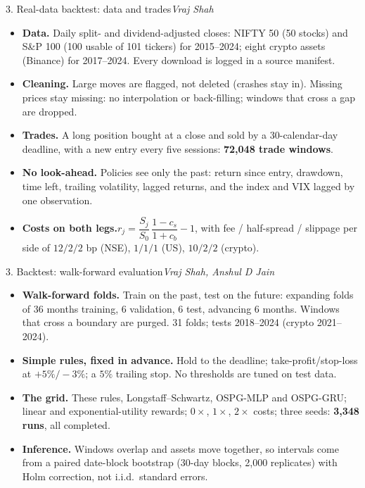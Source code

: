 \documentclass[aspectratio=169,11pt]{beamer}
\newcommand{\by}[1]{\hfill{\normalfont\small\itshape #1}}
\begin{document}
\begin{frame}{3. Real-data backtest: data and trades\by{Vraj Shah}}
\begin{itemize}
\item \textbf{Data.} Daily split- and dividend-adjusted closes: NIFTY 50 (50 stocks) and
  S\&P 100 (100 usable of 101 tickers) for 2015--2024; eight crypto assets (Binance) for
  2017--2024. Every download is logged in a source manifest.
\item \textbf{Cleaning.} Large moves are flagged, not deleted (crashes stay in). Missing prices
  stay missing: no interpolation or back-filling; windows that cross a gap are dropped.
\item \textbf{Trades.} A long position bought at a close and sold by a 30-calendar-day deadline,
  with a new entry every five sessions: \textbf{72{,}048 trade windows}.
\item \textbf{No look-ahead.} Policies see only the past: return since entry, drawdown, time left,
  trailing volatility, lagged returns, and the index and VIX lagged by one observation.
\item \textbf{Costs on both legs.}\quad $r_j=\dfrac{S_j}{S_0}\,\dfrac{1-c_s}{1+c_b}-1$, with fee /
  half-spread / slippage per side of $12/2/2$ bp (NSE), $1/1/1$ (US), $10/2/2$ (crypto).
\end{itemize}
\end{frame}

\begin{frame}{3. Backtest: walk-forward evaluation\by{Vraj Shah, Anshul D Jain}}
\begin{itemize}
\item \textbf{Walk-forward folds.} Train on the past, test on the future: expanding folds of
  36 months training, 6 validation, 6 test, advancing 6 months. Windows that cross a boundary
  are purged. 31 folds; tests 2018--2024 (crypto 2021--2024).
\item \textbf{Simple rules, fixed in advance.} Hold to the deadline; take-profit/stop-loss at
  $+5\%/-3\%$; a $5\%$ trailing stop. No thresholds are tuned on test data.
\item \textbf{The grid.} These rules, Longstaff--Schwartz, OSPG-MLP and OSPG-GRU; linear and
  exponential-utility rewards; $0\times$, $1\times$, $2\times$ costs; three seeds:
  \textbf{3{,}348 runs}, all completed.
\item \textbf{Inference.} Windows overlap and assets move together, so intervals come from a
  paired date-block bootstrap (30-day blocks, 2{,}000 replicates) with Holm correction, not
  i.i.d.\ standard errors.
\end{itemize}
\end{frame}
\end{document}
